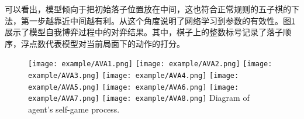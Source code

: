 可以看出，模型倾向于把初始落子位置放在中间，这也符合正常规则的五子棋的下法，第一步越靠近中间越有利。从这个角度说明了网络学习到参数的有效性。图\ref{figAIvsAI}展示了模型自我博弈过程中的对弈结果。其中，棋子上的整数标号记录了落子顺序，浮点数代表模型对当前局面下的动作的打分。

\begin{figure}[htpb]
	\centering
	\texttt{[image: example/AVA1.png]}
	\hspace{0.5cm}
	\texttt{[image: example/AVA2.png]}
	\hspace{0.5cm}
	\texttt{[image: example/AVA3.png]}
	\hspace{0.5cm}
	\texttt{[image: example/AVA4.png]}
	\hspace{0.5cm}
	\texttt{[image: example/AVA5.png]}
	\hspace{0.5cm}
	\texttt{[image: example/AVA6.png]}
	\hspace{0.5cm}
	\texttt{[image: example/AVA7.png]}
	\hspace{0.5cm}
	\texttt{[image: example/AVA8.png]}
	{Diagram of agent's self-game process.}
	\label{figAIvsAI}
\end{figure}
%
%
%
